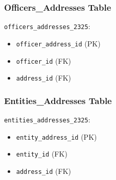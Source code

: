 \documentclass{article}
\begin{document}
\begin{minipage}{0.5\textwidth}
    \subsubsection*{Officers\_Addresses Table}
    \texttt{officers\_addresses\_2325}:
    \begin{itemize}
        \item \texttt{officer\_address\_id} (PK)
        \item \texttt{officer\_id} (FK)
        \item \texttt{address\_id} (FK)
    \end{itemize}

    \subsubsection*{Entities\_Addresses Table}
    \texttt{entities\_addresses\_2325}:
    \begin{itemize}
        \item \texttt{entity\_address\_id} (PK)
        \item \texttt{entity\_id} (FK)
        \item \texttt{address\_id} (FK)
    \end{itemize}

\end{minipage}
\end{document}

